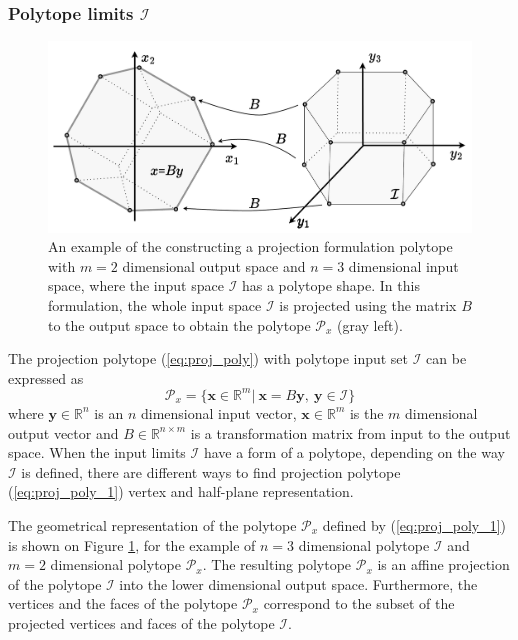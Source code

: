\subsubsection{Polytope limits $\mathcal{I}$}
\label{ch:proj_poly_chapter}
\begin{figure}[h]
    \centering
    \includegraphics[width=0.7\linewidth]{Chapters/imgs/proj_poly.pdf}
    \caption{An example of the constructing a projection formulation polytope with $m=2$ dimensional output space and $n=3$ dimensional input space, where the input space $\mathcal{I}$ has a polytope shape. In this formulation, the whole input space $\mathcal{I}$ is projected using the matrix $B$ to the output space to obtain the polytope $\mathcal{P}_x$ (gray left). }
    \label{fig:proj_poly}
\end{figure}

The projection polytope (\ref{eq:proj_poly}) with polytope input set $\mathcal{I}$ can be expressed as
\begin{equation}
    \mathcal{P}_x=\{\bm{x}\in\mathbb{R}^m |~ \bm{x} = B\bm{y},~\bm{y} \in \mathcal{I}  \}
    \label{eq:proj_poly_1}
\end{equation}
where $\bm{y}\in\mathbb{R}^n$ is an $n$ dimensional input vector, $\bm{x}\in\mathbb{R}^m$ is the $m$ dimensional output vector and $B\in\mathbb{R}^{n\times m}$ is a transformation matrix from input to the output space.
When the input limits $\mathcal{I}$ have a form of a polytope, depending on the way $\mathcal{I}$ is defined, there are different ways to find projection polytope (\ref{eq:proj_poly_1}) vertex and half-plane representation. 

The geometrical representation of the polytope $\mathcal{P}_x$ defined by (\ref{eq:proj_poly_1}) is shown on Figure \ref{fig:proj_poly}, for the example of $n=3$ dimensional polytope $\mathcal{I}$ and $m=2$ dimensional polytope $\mathcal{P}_x$. The resulting polytope $\mathcal{P}_x$ is an affine projection of the polytope $\mathcal{I}$ into the lower dimensional output space. Furthermore, the vertices and the faces of the polytope $\mathcal{P}_x$ correspond to the subset of the projected vertices and faces of the polytope $\mathcal{I}$. 


